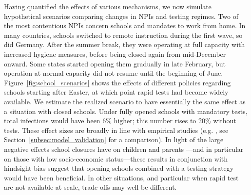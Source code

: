 Having quantified the effects of various mechanisms, we now simulate hypothetical
scenarios comparing changes in NPIs and testing regimes. Two of the most contentious
NPIs concern schools and mandates to work from home. In many countries, schools switched
to remote instruction during the first wave, so did Germany. After the summer break,
they were operating at full capacity with increased hygiene measures, before being
closed again from mid-December onward. Some states started opening them gradually in
late February, but operation at normal capacity did not resume until the beginning of
June. Figure~\ref{fig:school_scenarios} shows the effects of different policies
regarding schools starting after Easter, at which point rapid tests had become widely
available. We estimate the realized scenario to have essentially the same effect as a
situation with closed schools. Under fully opened schools with mandatory tests, total
infections would have been 6\% higher; this number rises to 20\% without tests. These
effect sizes are broadly in line with empirical studies (e.g. \citet{Vlachos2021,
Berger2021}, see Section~\ref{subsec:model_validation} for a comparison). In light of
the large negative effects school closures have on children and parents
\citep{Luijten2021, Melegari2021}---and in particular on those with low socio-economic
status---these results in conjunction with hindsight bias suggest that opening schools
combined with a testing strategy would have been beneficial. In other situations, and
particular when rapid test are not available at scale, trade-offs may well be different.

